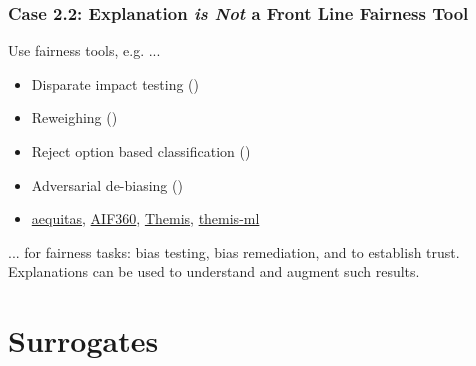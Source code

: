 \documentclass[11pt,aspectratio=169,hyperref={colorlinks}]{beamer}
\begin{document}
	\begin{frame}[label={not_frontline}]
	
		\frametitle{\textbf{Case 2.2}: Explanation \textbf{\textit{is Not}} a Front Line Fairness Tool}
		\large
		Use fairness tools, e.g. ...
		\vspace{5pt}
		\begin{itemize}\normalsize
			\item Disparate impact testing (\citet{feldman2015certifying})
			\item Reweighing (\citet{kamiran2012data})
			\item Reject option based classification (\citet{kamiran2012decision})
			\item Adversarial de-biasing (\citet{zhang2018mitigating})
			\item \href{https://github.com/dssg/aequitas}{aequitas}, \href{https://github.com/IBM/AIF360}{AIF360}, \href{https://github.com/LASER-UMASS/Themis}{Themis}, \href{https://github.com/cosmicBboy/themis-ml}{themis-ml}
		\end{itemize}
		\vspace{5pt}
		... for fairness tasks: bias testing, bias remediation, and to establish trust.\\
		\vspace{10pt}
		Explanations can be used to understand and augment such results.
		
	\end{frame}
	
	\section{Surrogates}

	\subsection*{} %
	
\end{document}
